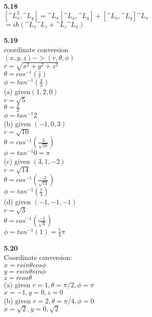 \documentclass{article}
\begin{document}
\textbf{5.18}\\
$[\^{L}_x^2,\^{L}_y] = \^{L}_x[\^{L}_x,\^{L}_y]+ [\^{L}_x,\^{L}_y]\^{L}_x$\\
$=i\hbar(\^{L}_x\^{L}_z+\^{L}_z\^{L}_x)$\\
\newline

\textbf{5.19}\\
coordinate conversion\\
$(x,y,z) -> (r,\theta,\phi)$\\
$r = \sqrt{x^2+y^2+z^2}$\\
$\theta = cos^{-1}(\frac{z}{r})$\\
$\phi = tan^{-1}(\frac{y}{x})$\\
(a) given$(1,2,0)$\\
$r = \sqrt{5}$\\
$\theta = \frac{\pi}{2}$\\
$\phi = tan^{-1}2$\\
(b) given $(-1, 0, 3)$\\
$r = \sqrt{10}$\\
$\theta = cos^{-1}(\frac{3}{\sqrt{10}})$\\
$\phi = tan^{-1}0 = \pi$\\
(c) given $(3,1,-2)$\\
$r = \sqrt{14}$\\
$\theta = cos^{-1}(\frac{-2}{\sqrt{14}})$\\
$\phi = tan^{-1}(\frac{1}{3})$\\
(d) given $(-1,-1,-1)$\\
$r = \sqrt{3}$\\
$\theta = cos^{-1}(\frac{-1}{\sqrt{3}})$\\
$\phi = tan^{-1}(1) = \frac{5}{4}\pi$\\
\newline

\textbf{5.20}\\
Coordinate conversion:\\
$x = rsin\theta cos\phi$\\
$y = rsin\theta sin \phi$\\
$z = rcos\theta$\\
(a) given $r = 1, \theta = \pi/2, \phi = \pi$\\
$x = -1, y = 0, z = 0$\\
(b) given $r = 2, \theta = \pi/4, \phi = 0$\\
$x = \sqrt{2}, y = 0, \sqrt{2}$\\
\newline
\end{document}

